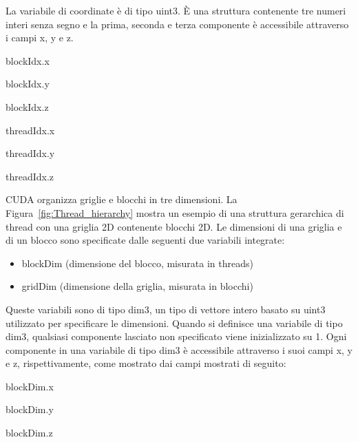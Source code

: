 La variabile di coordinate è di tipo uint3. È una struttura contenente tre numeri interi senza segno e la prima, seconda e terza componente è accessibile attraverso i campi x, y e z.

blockIdx.x

blockIdx.y

blockIdx.z

threadIdx.x

threadIdx.y

threadIdx.z

CUDA organizza griglie e blocchi in tre dimensioni. La Figura~\ref{fig:Thread_hierarchy} mostra un esempio di una struttura gerarchica di thread con una griglia 2D contenente blocchi 2D. Le dimensioni di una griglia e di un blocco sono specificate dalle seguenti due variabili integrate:
\begin{itemize}
	\item blockDim (dimensione del blocco, misurata in threads)
	\item gridDim (dimensione della griglia, misurata in blocchi)
\end{itemize}
Queste variabili sono di tipo dim3, un tipo di vettore intero basato su uint3 utilizzato per specificare le dimensioni. Quando si definisce una variabile di tipo dim3, qualsiasi componente lasciato non specificato viene inizializzato su 1. Ogni componente in una variabile di tipo dim3 è accessibile attraverso i suoi campi x, y e z, rispettivamente, come mostrato dai campi mostrati di seguito:

blockDim.x

blockDim.y

blockDim.z
